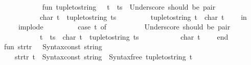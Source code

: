 \begin{isabellebody}
\ \ \ \ \ \ {\isacharasterisk}{\kern0pt}{\isacharparenright}{\kern0pt}\isanewline
\ \ \ \ \ \ fun\ tuple{\isacharunderscore}{\kern0pt}to{\isacharunderscore}{\kern0pt}string\ {\isacharparenleft}{\kern0pt}{\isacharunderscore}{\kern0pt}\ {\isachardollar}{\kern0pt}\ t\ {\isachardollar}{\kern0pt}\ ts{\isacharparenright}{\kern0pt}\ {\isacharequal}{\kern0pt}\ {\isacharparenleft}{\kern0pt}{\isacharasterisk}{\kern0pt}Underscore\ should\ be\ {\isasymopen}pair{\isasymclose}{\isacharbang}{\kern0pt}{\isacharasterisk}{\kern0pt}{\isacharparenright}{\kern0pt}\isanewline
\ \ \ \ \ \ \ \ \ \ \ \ char\ t\ {\isacharcolon}{\kern0pt}{\isacharcolon}{\kern0pt}\ tuple{\isacharunderscore}{\kern0pt}to{\isacharunderscore}{\kern0pt}string\ ts\isanewline
\ \ \ \ \ \ \ \ {\isacharbar}{\kern0pt}\ tuple{\isacharunderscore}{\kern0pt}to{\isacharunderscore}{\kern0pt}string\ t\ {\isacharequal}{\kern0pt}\ {\isacharbrackleft}{\kern0pt}char\ t{\isacharbrackright}{\kern0pt}\isanewline
\ \ \ \ in\isanewline
\ \ \ \ \ \ implode\ {\isacharparenleft}{\kern0pt}\isanewline
\ \ \ \ \ \ \ \ case\ t\ of\isanewline
\ \ \ \ \ \ \ \ \ \ {\isacharparenleft}{\kern0pt}{\isacharasterisk}{\kern0pt}Underscore\ should\ be\ {\isasymopen}pair{\isasymclose}{\isacharbang}{\kern0pt}{\isacharasterisk}{\kern0pt}{\isacharparenright}{\kern0pt}\isanewline
\ \ \ \ \ \ \ \ \ \ {\isacharparenleft}{\kern0pt}{\isacharunderscore}{\kern0pt}\ {\isachardollar}{\kern0pt}\ t\ {\isachardollar}{\kern0pt}\ ts{\isacharparenright}{\kern0pt}\ {\isacharequal}{\kern0pt}{\isachargreater}{\kern0pt}\ char\ t\ {\isacharcolon}{\kern0pt}{\isacharcolon}{\kern0pt}\ tuple{\isacharunderscore}{\kern0pt}to{\isacharunderscore}{\kern0pt}string\ ts\isanewline
\ \ \ \ \ \ \ \ {\isacharbar}{\kern0pt}\ {\isacharunderscore}{\kern0pt}\ {\isacharequal}{\kern0pt}{\isachargreater}{\kern0pt}\ {\isacharbrackleft}{\kern0pt}char\ t{\isacharbrackright}{\kern0pt}{\isacharparenright}{\kern0pt}\isanewline
\ \ \ \ end\isanewline
\isanewline
\ \ fun\ str{\isacharunderscore}{\kern0pt}tr{\isacharprime}{\kern0pt}\ {\isacharbrackleft}{\kern0pt}{\isacharbrackright}{\kern0pt}\ {\isacharequal}{\kern0pt}\ Syntax{\isachardot}{\kern0pt}const\ \isactrlsyntaxUNDERSCOREconst {\isasymopen}{\isacharunderscore}{\kern0pt}string{\isasymclose}\isanewline
\ \ \ \ {\isacharbar}{\kern0pt}\ str{\isacharunderscore}{\kern0pt}tr{\isacharprime}{\kern0pt}\ {\isacharbrackleft}{\kern0pt}t{\isacharbrackright}{\kern0pt}\ {\isacharequal}{\kern0pt}\ Syntax{\isachardot}{\kern0pt}const\ \isactrlsyntaxUNDERSCOREconst {\isasymopen}{\isacharunderscore}{\kern0pt}string{\isasymclose}\ {\isachardollar}{\kern0pt}\ Syntax{\isachardot}{\kern0pt}free\ {\isacharparenleft}{\kern0pt}tuple{\isacharunderscore}{\kern0pt}to{\isacharunderscore}{\kern0pt}string\ t{\isacharparenright}{\kern0pt}\isanewline

\end{isabellebody}
